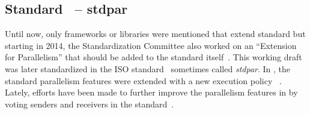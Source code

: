 \subsection{Standard \cpp\ -- stdpar}
\label{sec:frameworks:stdpar}

Until now, only frameworks or libraries were mentioned that extend standard \cpp but starting in 2014, the \cpp Standardization Committee also worked on an \enquote{Extension for Parallelism} that should be added to the \cpp standard itself~\cite{hoberock_n3960_2014}. 
This working draft was later standardized in the ISO  standard~\cite{hoberock_p0024r2_2016, international_organization_for_standardization_isoiec_2017} sometimes called \textit{stdpar}. 
In , the \cpp standard parallelism features were extended with a new execution policy ~\cite{meredith_p1001r2_2019}. 
Lately, efforts have been made to further improve the parallelism features in \cpp by voting senders and receivers in the  standard~\cite{dominiak_p2300r10_2024, baker_p3396r0_2024, niebler_p3325r5_2024}. 

